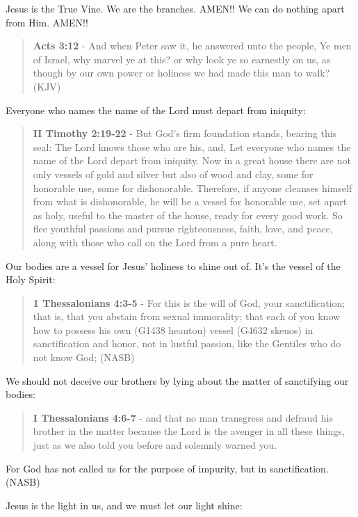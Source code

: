\documentclass[11pt]{article}
\begin{document}
Jesus is the True Vine. We are the branches. AMEN!! We can do nothing apart from Him. AMEN!!

\begin{quote}
\textbf{Acts 3:12} - And when Peter saw it, he answered unto the people, Ye men of Israel, why marvel ye at this? or why look ye so earnestly on us, as though by our own power or holiness we had made this man to walk? (KJV)
\end{quote}

Everyone who names the name of the Lord must depart from iniquity:

\begin{quote}
\textbf{II Timothy 2:19-22} - But God's firm foundation stands, bearing this seal: The Lord knows those who are his, and, Let everyone who names the name of the Lord depart from iniquity. Now in a great house there are not only vessels of gold and silver but also of wood and clay, some for honorable use, some for dishonorable. Therefore, if anyone cleanses himself from what is dishonorable, he will be a vessel for honorable use, set apart as holy, useful to the master of the house, ready for every good work. So flee youthful passions and pursue righteousness, faith, love, and peace, along with those who call on the Lord from a pure heart.
\end{quote}

Our bodies are a vessel for Jesus' holiness to shine out of. It's the vessel of the Holy Spirit:

\begin{quote}
\textbf{1 Thessalonians 4:3-5} - For this is the will of God, your sanctification; that is, that you abstain from sexual immorality; that each of you know how to possess his own (G1438 heautou) vessel (G4632 skeuos) in sanctification and honor, not in lustful passion, like the Gentiles who do not know God; (NASB)
\end{quote}

We should not deceive our brothers by lying about the matter of sanctifying our bodies:

\begin{quote}
\textbf{I Thessalonians 4:6-7} - and that no man transgress and defraud his brother in the matter because the Lord is the avenger in all these things, just as we also told you before and solemnly warned you.
\end{quote}
For God has not called us for the purpose of impurity, but in sanctification. (NASB)

Jesus is the light in us, and we must let our light shine:
\end{document}
